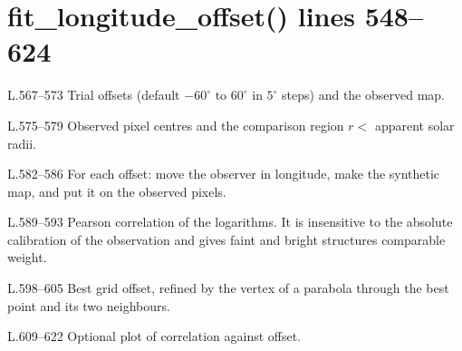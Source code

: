 \section*{\normalsize fit\_longitude\_offset() \hfill{\small\mdseries\color{gray}lines 548--624}}

\begin{lines}
\item[L.567–573] Trial offsets (default $-60^\circ$ to $60^\circ$ in $5^\circ$ steps) and the observed map.
\item[L.575–579] Observed pixel centres and the comparison region $r<$  apparent solar radii.
\item[L.582–586] For each offset: move the observer in longitude, make the synthetic map, and put it on the observed pixels.
\item[L.589–593] Pearson correlation of the logarithms. It is insensitive to the absolute calibration of the observation and gives faint and bright structures comparable weight.
\item[L.598–605] Best grid offset, refined by the vertex of a parabola through the best point and its two neighbours.
\item[L.609–622] Optional plot of correlation against offset.
\end{lines}
